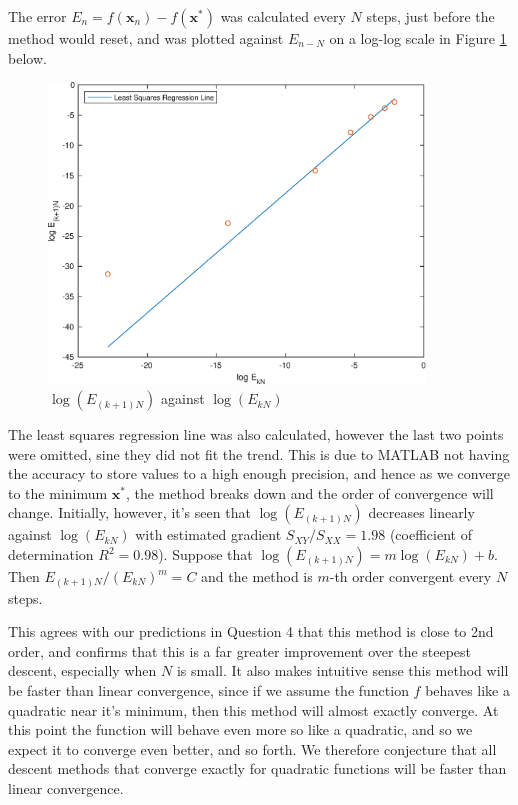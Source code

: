 \documentclass[10pt,a4paper,notitlepage]{article}
\newcommand{\x}{\mathbf{x}}
\begin{document}
The error $E_{n}=f(\x_{n})-f(\x^{*})$ was calculated every $N$ steps, just before the method would reset, and was plotted against $E_{n-N}$ on a log-log scale in Figure \ref{fg:0} below. 
\begin{figure}[H]
\centering
\includegraphics[width=10cm]{Regression_Line}
\caption{$\log (E_{(k+1)N})$ against $\log(E_{kN})$}\label{fg:0}
\end{figure}
 The least squares regression line was also calculated, however the last two points were omitted, sine they did not fit the trend. This is due to MATLAB not having the accuracy to store values to a high enough precision, and hence as we converge to the minimum $\x^{*}$, the method breaks down and the order of convergence will change. Initially, however, it's seen that $\log(E_{(k+1)N})$ decreases linearly against $\log(E_{kN})$ with estimated gradient $S_{XY}/S_{XX}=1.98$ (coefficient of determination $R^{2}=0.98$). Suppose that $\log(E_{(k+1)N})=m\log(E_{kN})+b$. Then $E_{(k+1)N}/(E_{kN})^{m}=C$ and the method is $m$-th order convergent every $N$ steps. 
 
 This agrees with our predictions in Question 4 that this method is close to 2nd order, and confirms that this is a far greater improvement over the steepest descent, especially when $N$ is small. It also makes intuitive sense this method will be faster than linear convergence, since if we assume the function $f$ behaves like a quadratic near it's minimum, then this method will almost exactly converge. At this point the function will behave even more so like a quadratic, and so we expect it to converge even better, and so forth. We therefore conjecture that all descent methods that converge exactly for quadratic functions will be faster than linear convergence. \\
\end{document}
